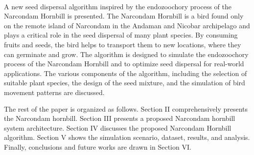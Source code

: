 \documentclass[conference]{IEEEtran}
\begin{document}
\\A new seed dispersal algorithm inspired by the endozoochory process of the Narcondam Hornbill\cite{4} is presented. The Narcondam Hornbill is a bird found only on the remote island of Narcondam in the Andaman and Nicobar archipelago and plays a critical role in the seed dispersal of many plant species. By consuming fruits and seeds, the bird helps to transport them to new locations, where they can germinate and grow. The algorithm is designed to simulate the endozoochory process of the Narcondam Hornbill and to optimize seed dispersal for real-world applications. The various components of the algorithm, including the selection of suitable plant species, the design of the seed mixture, and the simulation of bird movement patterns are discussed.

The rest of the paper is organized as follows. Section II comprehensively presents the Narcondam hornbill. Section III presents a proposed Narcondam hornbill system architecture. Section IV discusses the proposed Narcondam Hornbill algorithm. Section V shows the simulation scenario, dataset, results, and analysis. Finally, conclusions and future works are drawn in Section VI.
\end{document}
